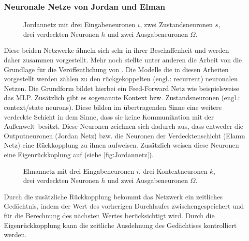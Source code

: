 \subsubsection{Neuronale Netze von Jordan und Elman}%
\begin{figure}[!htb]
    \centering
        
    \caption{Jordannetz mit drei Eingabeneuronen $i$, zwei Zustandsneuronen $s$, drei verdeckten Neuronen $h$ und zwei Ausgabeneuronen $\Omega$.}
    \label{fig:Jordannetz}
\end{figure}

Diese beiden Netzwerke ähneln sich sehr in ihrer Beschaffenheit und werden daher zusammen vorgestellt. Mehr noch stellte unter anderen die Arbeit von \citet{Jordan1986} die Grundlage für die Veröffentlichung von \citet{Elman1990}. Die Modelle die in diesen Arbeiten vorgestellt werden zählen zu den rückgekoppelten (engl.: recurrent) neuronalen Netzen. Die Grundform bildet hierbei ein Feed-Forward Netz wie beispielsweise das MLP. Zusätzlich gibt es sogenannte Kontext bzw. Zustandsneuronen (engl.: context/state neurons). Diese bilden im übertragenden Sinne eine weitere verdeckte Schicht in dem Sinne, dass sie keine Kommunikation mit der \glqq Außenwelt\grqq~besitzt. Diese Neuronen zeichnen sich dadurch aus, dass entweder die Outputneuronen (Jordan Netz) bzw. die Neuronen der Verdecktenschicht (Elamn Netz) eine Rückkopplung zu ihnen aufweisen. Zusätzlich weisen diese Neuronen eine Eigenrückkoplung auf (siehe \autoref{fig:Jordannetz}). 

\begin{figure}[!htb]
    \centering
        
    \caption{Elmannetz mit drei Eingabeneuronen $i$, drei Kontextneuronen $k$, drei verdeckten Neuronen $h$ und zwei Ausgabeneuronen $\Omega$.}
    \label{fig:Elman}
\end{figure}

Durch die zusätzliche Rückkopplung bekommt das Netzwerk ein zeitliches Gedächtnis, indem der Wert des vorherigen Durchlaufes zwischengespeichert und für die Berechnung des nächsten Wertes berücksichtigt wird. Durch die Eigenrückkopplung kann die zeitliche Ausdehnung des Gedächtises kontrolliert werden. 

